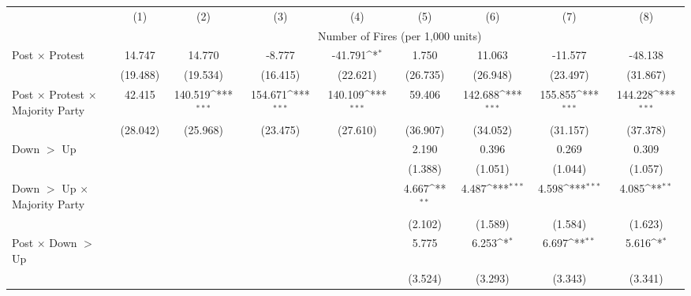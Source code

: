 {
\def\sym#1{\ifmmode^{#1}\else\(^{#1}\)\fi}
\begin{tabular}{l*{8}{c}}
\hline
& (1) & (2) & (3) & (4) & (5) & (6) & (7) & (8) \\
            & \multicolumn{8}{c}{Number of Fires (per 1,000 units)} \\
             \hline

Post $\times$ Protest&      14.747         &      14.770         &      -8.777         &     -41.791\sym{*}  &       1.750         &      11.063         &     -11.577         &     -48.138         \\
            &    (19.488)         &    (19.534)         &    (16.415)         &    (22.621)         &    (26.735)         &    (26.948)         &    (23.497)         &    (31.867)         \\
Post $\times$ Protest $\times$ Majority Party&      42.415         &     140.519\sym{***}&     154.671\sym{***}&     140.109\sym{***}&      59.406         &     142.688\sym{***}&     155.855\sym{***}&     144.228\sym{***}\\
            &    (28.042)         &    (25.968)         &    (23.475)         &    (27.610)         &    (36.907)         &    (34.052)         &    (31.157)         &    (37.378)         \\
Down $>$ Up &                     &                     &                     &                     &       2.190         &       0.396         &       0.269         &       0.309         \\
            &                     &                     &                     &                     &     (1.388)         &     (1.051)         &     (1.044)         &     (1.057)         \\
Down $>$ Up $\times$ Majority Party&                     &                     &                     &                     &       4.667\sym{**} &       4.487\sym{***}&       4.598\sym{***}&       4.085\sym{**} \\
            &                     &                     &                     &                     &     (2.102)         &     (1.589)         &     (1.584)         &     (1.623)         \\
Post $\times$ Down $>$ Up&                     &                     &                     &                     &       5.775         &       6.253\sym{*}  &       6.697\sym{**} &       5.616\sym{*}  \\
            &                     &                     &                     &                     &     (3.524)         &     (3.293)         &     (3.343)         &     (3.341)         \\

\end{tabular}}
